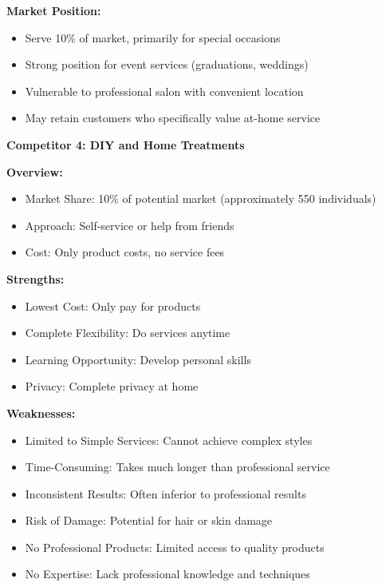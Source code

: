 \textbf{Market Position:}
\begin{itemize}[leftmargin=2em]
    \item Serve 10\% of market, primarily for special occasions
    \item Strong position for event services (graduations, weddings)
    \item Vulnerable to professional salon with convenient location
    \item May retain customers who specifically value at-home service
\end{itemize}

\vspace{1em}

\textbf{Competitor 4: DIY and Home Treatments}

\textbf{Overview:}
\begin{itemize}[leftmargin=2em]
    \item Market Share: 10\% of potential market (approximately 550 individuals)
    \item Approach: Self-service or help from friends
    \item Cost: Only product costs, no service fees
\end{itemize}

\textbf{Strengths:}
\begin{itemize}[leftmargin=2em]
    \item Lowest Cost: Only pay for products
    \item Complete Flexibility: Do services anytime
    \item Learning Opportunity: Develop personal skills
    \item Privacy: Complete privacy at home
\end{itemize}

\textbf{Weaknesses:}
\begin{itemize}[leftmargin=2em]
    \item Limited to Simple Services: Cannot achieve complex styles
    \item Time-Consuming: Takes much longer than professional service
    \item Inconsistent Results: Often inferior to professional results
    \item Risk of Damage: Potential for hair or skin damage
    \item No Professional Products: Limited access to quality products
    \item No Expertise: Lack professional knowledge and techniques
\end{itemize}


